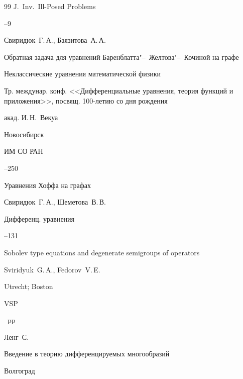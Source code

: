 \begin{thebibliography}{99}
\jour J.~Inv.~Ill-Posed Problems




--9




\by Свиридюк~Г.\,А., Баязитова~А.\,А.

\paper Обратная задача для уравнений Ба\-рен\-блат\-та"--~Желтова"--~Кочиной на графе

\inbook Неклассические уравнения математической физики

\bookinfo Тр. междунар. конф. <<Дифференциальные уравнения, теория функ\-ций и приложения>>, посвящ. 100-летию со дня рождения

акад. И.\,Н.~Векуа

\publaddr Новосибирск

\publ  ИМ СО РАН


--250




\paper Уравнения Хоффа на графах

\by Свиридюк~Г.\,А., Шеметова~В.\,В.

\jour Дифференц. уравнения




--131






\book Sobolev type equations and degenerate semi\-groups of operators

\by  Sviridyuk~G.\,A., Fedorov~V.\,E.

\publaddr Utrecht; Boston

\publ VSP


~pp






\by Ленг~С.

\book Введение в теорию дифференцируемых многообразий

\publaddr Волгоград


\end{thebibliography}
